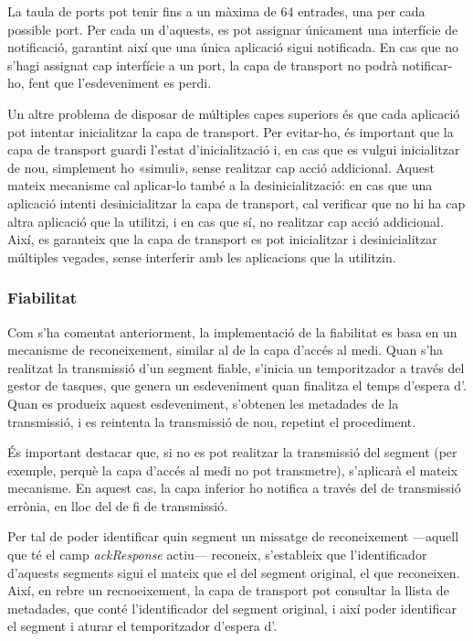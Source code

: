 \documentclass{tfgitic}[2024/07/01]
\begin{document}
{La taula de ports pot tenir fins a un màxima de 64 entrades, una per cada possible port. Per cada un d'aquests, es pot assignar únicament una interfície de notificació, garantint així que una única aplicació sigui notificada. En cas que no s'hagi assignat cap interfície a un port, la capa de transport no podrà notificar-ho, fent que l'esdeveniment es perdi.

Un altre problema de disposar de múltiples capes superiors és que cada aplicació pot intentar inicialitzar la capa de transport. Per evitar-ho, és important que la capa de transport guardi l'estat d'inicialització i, en cas que es vulgui inicialitzar de nou, simplement ho «simuli», sense realitzar cap acció addicional. Aquest mateix mecanisme cal aplicar-lo també a la desinicialització: en cas que una aplicació intenti desinicialitzar la capa de transport, cal verificar que no hi ha cap altra aplicació que la utilitzi, i en cas que sí, no realitzar cap acció addicional. Així, es garanteix que la capa de transport es pot inicialitzar i desinicialitzar múltiples vegades, sense interferir amb les aplicacions que la utilitzin.
\subsubsection{Fiabilitat}
\label{subsubsec:transport_fiabilitat}
Com s'ha comentat anteriorment, la implementació de la fiabilitat es basa en un mecanisme de reconeixement, similar al de la capa d'accés al medi.
Quan s'ha realitzat la transmissió d'un segment fiable, s'inicia un temporitzador a través del gestor de tasques, que genera un esdeveniment quan finalitza el temps d'espera d'. Quan es produeix aquest esdeveniment, s'obtenen les metadades de la transmissió, i es reintenta la transmissió de nou, repetint el procediment.

És important destacar que, si no es pot realitzar la transmissió del segment (per exemple, perquè la capa d'accés al medi no pot transmetre), s'aplicarà el mateix mecanisme. En aquest cas, la capa inferior ho notifica a través del  de transmissió errònia, en lloc del de fi de transmissió.

Per tal de poder identificar quin segment un missatge de reconeixement ---aquell que té el camp \emph{ackResponse} actiu--- reconeix, s'estableix que l'identificador d'aquests segments sigui el mateix que el del segment original, el que reconeixen. Així, en rebre un recnoeixement, la capa de transport pot consultar la llista de metadades, que conté l'identificador del segment original, i així poder identificar el segment i aturar el temporitzador d'espera d'.

}
\end{document}
